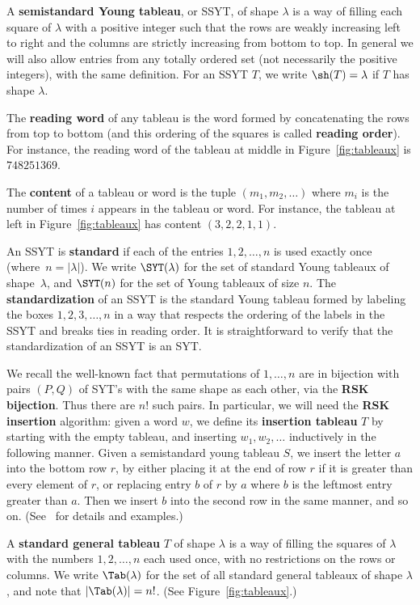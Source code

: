 A \textbf{semistandard Young tableau}, or SSYT, of shape $\lambda$ is a way of filling each square of $\lambda$ with a positive integer such that the rows are weakly increasing left to right and the columns are strictly increasing from bottom to top.  In general we will also allow entries from any totally ordered set (not necessarily the positive integers), with the same definition.   For an SSYT $T$, we write $\sh(T)=\lambda$ if $T$ has shape $\lambda$.


The \textbf{reading word} of any tableau is the word formed by concatenating the rows from top to bottom (and this ordering of the squares is called \textbf{reading order}).  For instance, the reading word of the tableau at middle in Figure~\ref{fig:tableaux} is $748251369$.

The \textbf{content} of a tableau or word is the tuple $(m_1,m_2,\ldots)$ where $m_i$ is the number of times $i$ appears in the tableau or word.  For instance, the tableau at left in Figure~\ref{fig:tableaux} has content $(3,2,2,1,1)$.


An SSYT is \textbf{standard} if each of the entries $1,2,\ldots,n$ is used exactly once (where~$n=|\lambda|$).  We write $\SYT(\lambda)$ for the set of standard Young tableaux of shape~$\lambda$, and $\SYT(n)$ for the set of Young tableaux of size $n$.  The \textbf{standardization} of an SSYT is the standard Young tableau formed by labeling the boxes $1,2,3,\ldots,n$ in a way that respects the ordering of the labels in the SSYT and breaks ties in reading order.  It is straightforward to verify that the standardization of an SSYT is an SYT.

We recall the well-known fact that permutations of $1,\ldots,n$ are in bijection with pairs $(P,Q)$ of SYT's with the same shape as each other, via the \textbf{RSK bijection}.  Thus there are $n!$ such pairs.  In particular, we will need the \textbf{RSK insertion} algorithm: given a word $w$, we define its \textbf{insertion tableau} $T$ by starting with the empty tableau, and inserting $w_1,w_2,\ldots$ inductively in the following manner.  Given a semistandard young tableau $S$, we insert the letter $a$ into the bottom row $r$, by either placing it at the end of row $r$ if it is greater than every element of $r$, or replacing entry $b$ of $r$ by $a$ where $b$ is the leftmost entry greater than $a$.  Then we insert $b$ into the second row in the same manner, and so on.  (See~\cite{Fulton} for details and examples.)

A \textbf{standard general tableau} $T$ of shape $\lambda$ is a way of filling the squares of $\lambda$ with the numbers $1,2,\ldots,n$ each used once, with no restrictions on the rows or columns.  We write $\Tab(\lambda)$ for the set of all standard general tableaux of shape $\lambda$, and note that $|\Tab(\lambda)|=n!$.  (See Figure~\ref{fig:tableaux}.)

